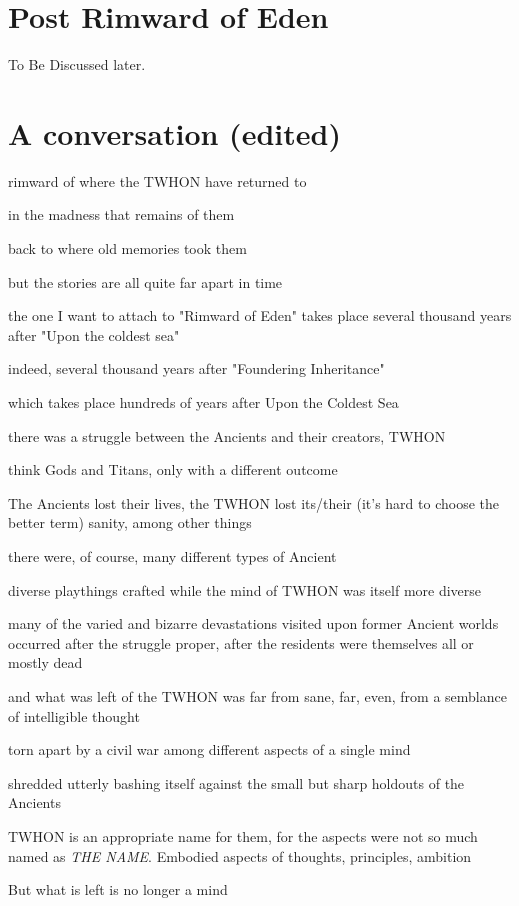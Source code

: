 \section{Post Rimward of Eden}
To Be Discussed later.

\section{A conversation (edited)}

rimward of where the TWHON have returned to

in the madness that remains of them

back to where old memories took them

but the stories are all quite far apart in time

the one I want to attach to "Rimward of Eden" takes place several thousand years after "Upon the coldest sea"

indeed, several thousand years after "Foundering Inheritance"

which takes place hundreds of years after Upon the Coldest Sea

there was a struggle between the Ancients and their creators, TWHON

think Gods and Titans, only with a different outcome

The Ancients lost their lives, the TWHON lost its/their (it's hard to choose the better term) sanity, among other things

there were, of course, many different types of Ancient

diverse playthings crafted while the mind of TWHON was itself more diverse

many of the varied and bizarre devastations visited upon former Ancient worlds occurred after the struggle proper, after the residents were themselves all or mostly dead

and what was left of the TWHON was far from sane, far, even, from a semblance of intelligible thought

torn apart by a civil war among different aspects of a single mind

shredded utterly bashing itself against the small but sharp holdouts of the Ancients

TWHON is an appropriate name for them, for the aspects were not so much named as {\em THE NAME}. Embodied aspects of thoughts, principles, ambition

But what is left is no longer a mind

